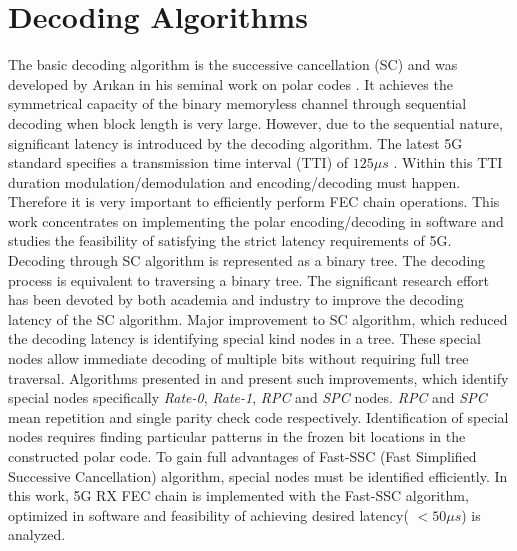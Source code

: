 
\section{Decoding Algorithms}
The basic decoding algorithm is the successive cancellation (SC) and was developed by Ar\i kan in his seminal work on polar codes \cite{Arikan}. It achieves the symmetrical capacity of the binary memoryless channel through sequential decoding when block length is very large. However, due to the sequential nature, significant latency is introduced by the decoding algorithm. The latest 5G standard specifies a transmission time interval (TTI) of $125 \mu s$ \cite{5G_TTI}. Within this TTI duration modulation/demodulation and encoding/decoding must happen. Therefore it is very important to efficiently perform FEC chain operations. This work concentrates on implementing the polar encoding/decoding in software and studies the feasibility of satisfying the strict latency requirements of 5G. Decoding through SC algorithm is represented as a binary tree. The decoding process is equivalent to traversing a binary tree. The significant research effort has been devoted by both academia and industry to improve the decoding latency of the SC algorithm. Major improvement to SC algorithm, which reduced the decoding latency is identifying special kind nodes in a tree. These special nodes allow immediate decoding of multiple bits without requiring full tree traversal. Algorithms presented in \cite{SSC} and \cite{fastSSC} present such improvements, which identify special nodes specifically \textit{Rate-0}, \textit{Rate-1}, \textit{RPC} and \textit{SPC} nodes. \textit{RPC} and \textit{SPC} mean repetition and single parity check code respectively. Identification of special nodes requires finding particular patterns in the frozen bit locations in the constructed polar code. To gain full advantages of Fast-SSC (Fast Simplified Successive Cancellation) algorithm, special nodes must be identified efficiently. In this work, 5G RX FEC chain is implemented with the Fast-SSC algorithm, optimized in software and feasibility of achieving desired latency( $< 50\mu s$) is analyzed.


